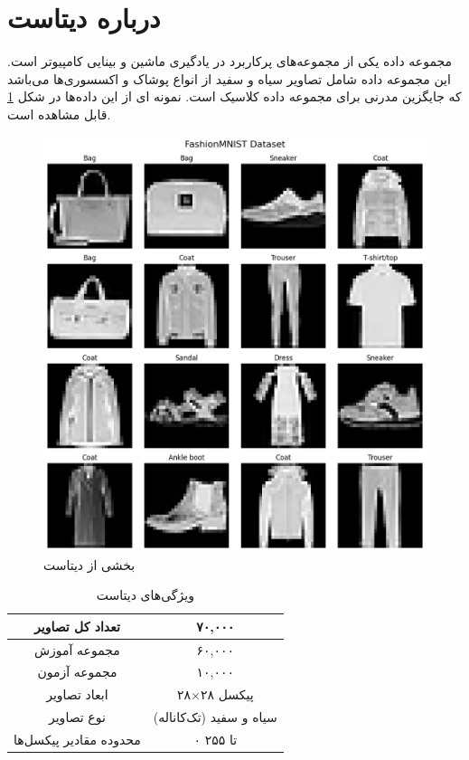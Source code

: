 \documentclass[12pt]{article}
\newcommand{\fm}{\lr{Fashion MNIST}}
\begin{document}
	\section{درباره دیتاست}
	مجموعه داده 
	 یکی از مجموعه‌های پرکاربرد در یادگیری ماشین و بینایی کامپیوتر است. این مجموعه داده شامل تصاویر سیاه و سفید از انواع پوشاک و اکسسوری‌ها می‌باشد که جایگزین مدرنی برای مجموعه داده کلاسیک  است.
	 نمونه ای از این داده‌ها در شکل
	 \ref{fig: fmn data}
	 قابل مشاهده است.
	 \begin{figure}[H]
	 	\centering
	 	\includegraphics[scale=0.45]{figs/fmn data raw}
	 	\caption{بخشی از دیتاست
	 		\fm
	 	}
	 	\label{fig: fmn data}
	 \end{figure}
	 \begin{table}[H]
	 	\centering			
	 	\begin{tabular}{|c|c|}
	 		\hline
	 		تعداد کل تصاویر & ۷۰,۰۰۰ \\
	 		\hline
	 		مجموعه آموزش & ۶۰,۰۰۰ \\
	 		\hline
	 		مجموعه آزمون & ۱۰,۰۰۰ \\
	 		\hline
	 		ابعاد تصاویر & ۲۸×۲۸ پیکسل \\
	 		\hline
	 		نوع تصاویر & سیاه و سفید (تک‌کاناله) \\
	 		\hline
	 		محدوده مقادیر پیکسل‌ها & ۰ تا ۲۵۵ \\
	 		\hline
	 	\end{tabular}
	 	\caption{ویژگی‌های دیتاست 
	 	}
	 	\label{tbl: fMNIST Chars}
	 \end{table}
\end{document}
